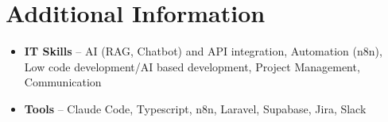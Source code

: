 \documentclass[a4paper,10pt]{article}
\begin{document}
\section{Additional Information}
\begin{itemize}
\item \textbf{IT Skills} -- AI (RAG, Chatbot) and API integration, Automation (n8n), Low code development/AI based development, Project Management, Communication
\item \textbf{Tools} -- Claude Code, Typescript, n8n, Laravel, Supabase, Jira, Slack
\end{itemize}
\end{document}
